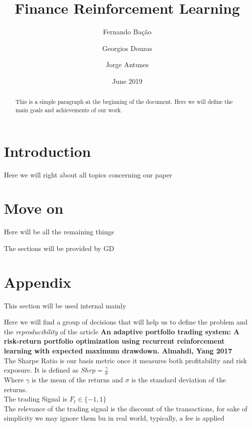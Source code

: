 \documentclass[12pt, a4paper, twoside]{article}
\title{Finance Reinforcement Learning}
\author[*]{Fernando Bação}
\author[*]{Georgios Douzas}
\author[*]{Jorge Antunes}
\affil[*]{Information Management School - NOVA IMS}
\date{June 2019}
\begin{document}
\maketitle

\begin{abstract}
	This is a simple paragraph at the beginning of the document. Here we will define the main goals and achievements of our work.
\end{abstract}


\section{Introduction}

Here we will right about all topics concerning our paper

\section{Move on}

Here will be all the remaining things

The sections will be provided by GD


\section{Appendix}

This section will be used internal mainly\par

Here we will find a group of decisions that will help us to define the problem and the \textit{reproducibility} of the article
\textbf{An adaptive portfolio trading system: A risk-return portfolio optimization using recurrent reinforcement learning with expected maximum drawdown. Almahdi, Yang 2017 }\\


The Sharpe Ratio is our basis metric once it measures both profitability and risk exposure. It is defined as $ Shrp = \frac{\gamma}{\sigma}$\\

Where $\gamma$ is the mean of the returns and $\sigma$ is the standard deviation of the returns.\\

The trading Signal is $F_t \in \{-1,1\}$\\
The relevance of the trading signal is the discount of the transactions, for sake of simplicity we may ignore them bu in real world, typically, a fee is applied
\end{document}

